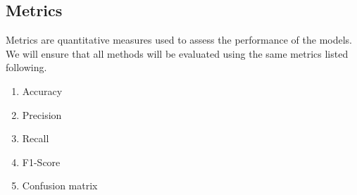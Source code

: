 \documentclass[10pt,twocolumn,letterpaper]{article}
\begin{document}




\subsection{Metrics}
\hspace{0.5cm} Metrics are quantitative measures used to assess the performance of the models. We will ensure that all methods will be evaluated using the same metrics listed following.
\begin{enumerate}[noitemsep]
    \item Accuracy
    \item Precision
    \item Recall
    \item F1-Score
    \item Confusion matrix
\end{enumerate}
\end{document}
